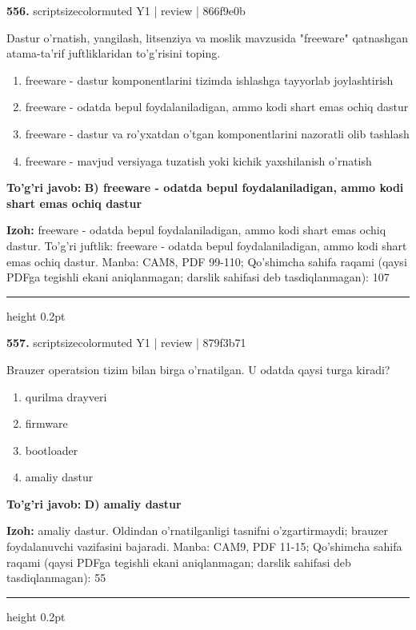 \documentclass[10pt,a4paper]{article}
\begin{document}
{\bfseries\sffamily\color{ink} 556.} {scriptsizecolor{muted} Y1 | review | 866f9e0b}
\par
Dastur o'rnatish, yangilash, litsenziya va moslik mavzusida "freeware" qatnashgan atama-ta'rif juftliklaridan to'g'risini toping.
\begin{enumerate}[label=\Alph*),leftmargin=9mm]
\item freeware - dastur komponentlarini tizimda ishlashga tayyorlab joylashtirish
\item freeware - odatda bepul foydalaniladigan, ammo kodi shart emas ochiq dastur
\item freeware - dastur va ro'yxatdan o'tgan komponentlarini nazoratli olib tashlash
\item freeware - mavjud versiyaga tuzatish yoki kichik yaxshilanish o'rnatish
\end{enumerate}
\begin{tcolorbox}[enhanced,breakable,colback=teal!4,colframe=teal!60!black,boxrule=0.45pt,arc=1.2mm,left=2.7mm,right=2.7mm,top=1.8mm,bottom=1.8mm,before skip=2mm,after skip=2mm]
{\bfseries\sffamily\color{teal}To'g'ri javob:} \textbf{B) freeware - odatda bepul foydalaniladigan, ammo kodi shart emas ochiq dastur}
\par\smallskip
{\bfseries Izoh:} freeware - odatda bepul foydalaniladigan, ammo kodi shart emas ochiq dastur. To'g'ri juftlik: freeware - odatda bepul foydalaniladigan, ammo kodi shart emas ochiq dastur. Manba: CAM8, PDF 99-110; Qo'shimcha sahifa raqami (qaysi PDFga tegishli ekani aniqlanmagan; darslik sahifasi deb tasdiqlanmagan): 107
\end{tcolorbox}
\vspace{2mm}\hrule height 0.2pt\vspace{3mm}

{\bfseries\sffamily\color{ink} 557.} {scriptsizecolor{muted} Y1 | review | 879f3b71}
\par
Brauzer operatsion tizim bilan birga o'rnatilgan. U odatda qaysi turga kiradi?
\begin{enumerate}[label=\Alph*),leftmargin=9mm]
\item qurilma drayveri
\item firmware
\item bootloader
\item amaliy dastur
\end{enumerate}
\begin{tcolorbox}[enhanced,breakable,colback=teal!4,colframe=teal!60!black,boxrule=0.45pt,arc=1.2mm,left=2.7mm,right=2.7mm,top=1.8mm,bottom=1.8mm,before skip=2mm,after skip=2mm]
{\bfseries\sffamily\color{teal}To'g'ri javob:} \textbf{D) amaliy dastur}
\par\smallskip
{\bfseries Izoh:} amaliy dastur. Oldindan o'rnatilganligi tasnifni o'zgartirmaydi; brauzer foydalanuvchi vazifasini bajaradi. Manba: CAM9, PDF 11-15; Qo'shimcha sahifa raqami (qaysi PDFga tegishli ekani aniqlanmagan; darslik sahifasi deb tasdiqlanmagan): 55
\end{tcolorbox}
\vspace{2mm}\hrule height 0.2pt\vspace{3mm}
\end{document}
